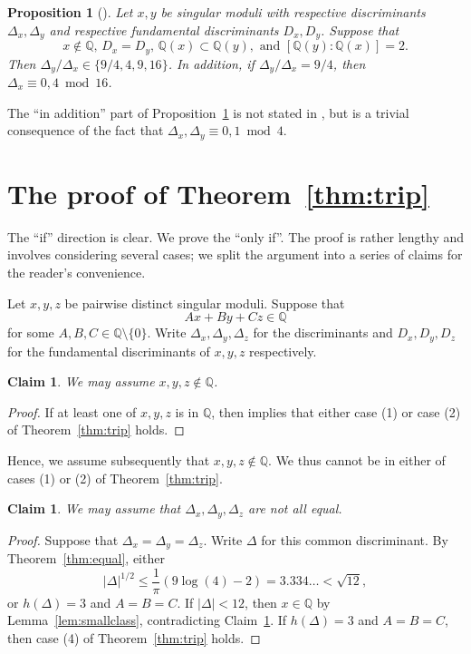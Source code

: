 \documentclass[11pt,a4paper, british]{amsart}
\newtheorem{prop}[thm]{Proposition}
\newtheorem{claim}[thm]{Claim}
\theoremstyle{definition}
\theoremstyle{remark}
\numberwithin{equation}{section}
\newcommand{\Q}{\mathbb{Q}} %
\begin{document}
\begin{prop}[{\cite[Lemma~2.3]{Fowler20}}]\label{prop:samefundsub}
	Let $x, y$ be singular moduli with respective discriminants $\Delta_x, \Delta_y$ and respective fundamental discriminants $D_x, D_y$. Suppose that 
	\[x \notin \Q, \, D_x = D_y, \, \Q(x) \subset \Q(y), \mbox{ and } [\Q(y) : \Q(x)] = 2.\]	
	Then $\Delta_y/ \Delta_x \in \{9/4, 4, 9, 16\}$. In addition, if $\Delta_y / \Delta_x = 9/4$, then $\Delta_x \equiv 0, 4 \bmod 16$. 
\end{prop}

The ``in addition'' part of Proposition~\ref{prop:samefundsub} is not stated in \cite[Lemma~2.3]{Fowler20}, but is a trivial consequence of the fact that $\Delta_x, \Delta_y \equiv 0, 1 \bmod 4$.


\section{The proof of Theorem~\ref{thm:trip}}\label{sec:trip}

The ``if'' direction is clear. We prove the ``only if''. The proof is rather lengthy and involves considering several cases; we split the argument into a series of claims for the reader's convenience.

Let $x, y, z$ be pairwise distinct singular moduli. Suppose that 
\[A x + B y + C z \in \Q\] 
for some $A, B, C \in \Q \setminus \{0\}$. Write $\Delta_x, \Delta_y, \Delta_z$ for the discriminants and $D_x, D_y, D_z$ for the fundamental discriminants of $x, y, z$ respectively.

\begin{claim}\label{cl1}
	We may assume $x, y, z \notin \Q$.
\end{claim} 

\begin{proof}
	If at least one of $x, y, z$ is in $\Q$, then \cite[Theorem~1.2]{AllombertBiluMadariaga15} implies that either case (1) or case (2) of Theorem~\ref{thm:trip} holds. 
\end{proof}

Hence, we assume subsequently that $x, y, z \notin \Q$. We thus cannot be in either of cases (1) or (2) of Theorem~\ref{thm:trip}.

\begin{claim}\label{cl2}
	We may assume that $\Delta_x, \Delta_y, \Delta_z$ are not all equal.
\end{claim}

\begin{proof}
Suppose that $\Delta_x = \Delta_y = \Delta_z$. Write $\Delta$ for this common discriminant. By Theorem~\ref{thm:equal}, either
\[ \lvert \Delta \rvert^{1/2} \leq \frac{1}{\pi} \left(9 \log\left(4\right) -2\right) = 3.334\ldots < \sqrt{12},\]
or $h(\Delta) = 3$ and $A = B = C$. If $\lvert \Delta \rvert < 12$, then $x \in \Q$ by Lemma~\ref{lem:smallclass}, contradicting Claim~\ref{cl1}. If $h(\Delta) = 3$ and $A=B=C$, then case (4) of Theorem~\ref{thm:trip} holds.	
\end{proof}
\end{document}

